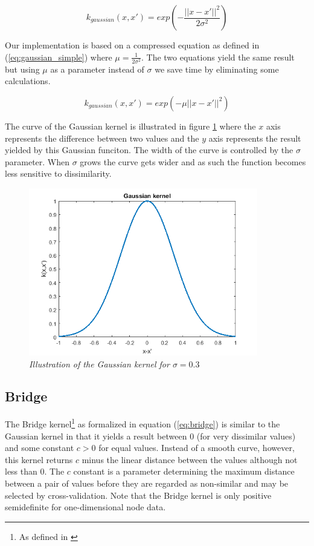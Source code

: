 \documentclass{article}
\begin{document}
\begin{equation}
\label{eq:gaussian}
k_{gaussian}(x, x') = exp(-\frac{||x - x'||^2}{2\sigma^2})
\end{equation}

Our implementation is based on a compressed equation as defined in (\ref{eq:gaussian_simple}) where $\mu=\frac{1}{2\sigma^2}$. The two equations yield the same result but using $\mu$ as a parameter instead of $\sigma$ we save time by eliminating some calculations.

\begin{equation}
\label{eq:gaussian_simple}
k_{gaussian}(x, x') = exp(-\mu ||x - x'||^2)
\end{equation}

The curve of the Gaussian kernel is illustrated in figure \ref{fig:gaussian_graph} where the $x$ axis represents the difference between two values and the $y$ axis represents the result yielded by this Gaussian funciton. The width of the curve is controlled by the $\sigma$ parameter. When $\sigma$ grows the curve gets wider and as such the function becomes less sensitive to dissimilarity.

\begin{figure}[H]
	\centering
	\includegraphics[width=10cm]{gaussian}
	\caption{\textit{Illustration of the Gaussian kernel for $\sigma = 0.3$}}
	\label{fig:gaussian_graph}
\end{figure}


\subsection{Bridge}
The Bridge kernel\footnote{As defined in \cite{shortest-path}} as formalized in equation (\ref{eq:bridge}) is similar to the Gaussian kernel in that it yields a result between 0 (for very dissimilar values) and some constant $c>0$ for equal values. Instead of a smooth curve, however, this kernel returns $c$ minus the linear distance between the values although not less than 0. The $c$ constant is a parameter determining the maximum distance between a pair of values before they are regarded as non-similar and may be selected by cross-validation. Note that the Bridge kernel is only positive semidefinite for one-dimensional node data.
\end{document}
